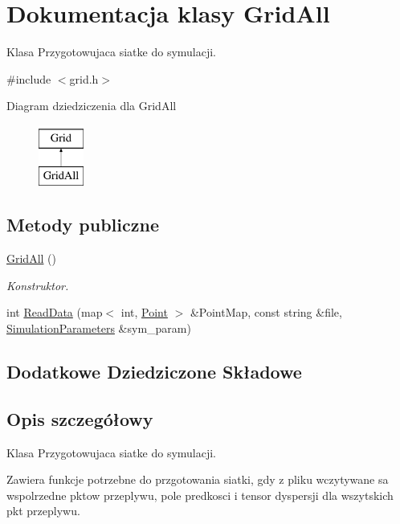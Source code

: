\hypertarget{class_grid_all}{}\section{Dokumentacja klasy Grid\+All}
\label{class_grid_all}


Klasa Przygotowujaca siatke do symulacji.  




{\ttfamily \#include $<$grid.\+h$>$}

Diagram dziedziczenia dla Grid\+All\begin{figure}[H]
\begin{center}
\leavevmode
\includegraphics[height=2.000000cm]{class_grid_all}
\end{center}
\end{figure}
\subsection*{Metody publiczne}
\begin{DoxyCompactItemize}
\item 
\hyperlink{class_grid_all_a88d71f62359e7cd339f74a1a37e4b95f}{Grid\+All} ()
\begin{DoxyCompactList}\small\item\em Konstruktor. \end{DoxyCompactList}\item 
int \hyperlink{class_grid_all_aa513371e605fe9bea7489edfe3d40a1f}{Read\+Data} (map$<$ int, \hyperlink{class_point}{Point} $>$ \&Point\+Map, const string \&file, \hyperlink{class_simulation_parameters}{Simulation\+Parameters} \&sym\+\_\+param)
\end{DoxyCompactItemize}
\subsection*{Dodatkowe Dziedziczone Składowe}


\subsection{Opis szczegółowy}
Klasa Przygotowujaca siatke do symulacji. 

Zawiera funkcje potrzebne do przgotowania siatki, gdy z pliku wczytywane sa wspolrzedne pktow przeplywu, pole predkosci i tensor dyspersji dla wszytskich pkt przeplywu. 

